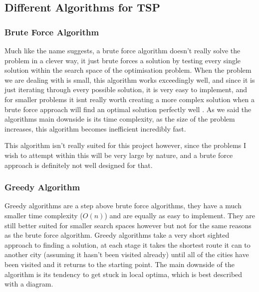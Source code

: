 \documentclass[11pt,a4paper,titlepage]{article}
\begin{document}
\subsection{Different Algorithms for TSP}

\subsubsection{Brute Force Algorithm}

Much like the name suggests, a brute force algorithm doesn't really solve the problem in a clever way, it just brute forces a solution by testing every single solution within the search space of the optimisation problem. When the problem we are dealing with is small, this algorithm works exceedingly well, and since it is just iterating through every possible solution, it is very easy to implement, and for smaller problems it isnt really worth creating a more complex solution when a brute force approach will find an optimal solution perfectly well \cite{DiffAlgs}. As we said the algorithms main downside is its time complexity, as the size of the problem increases, this algorithm becomes inefficient incredibly fast.

This algorithm isn't really suited for this project however, since the problems I wish to attempt within this will be very large by nature, and a brute force approach is definitely not well designed for that.

\subsubsection{Greedy Algorithm}

Greedy algorithms are a step above brute force algorithms, they have a much smaller time complexity ($O(n)$) and are equally as easy to implement. They are still better suited for smaller search spaces however but not for the same reasons as the brute force algorithm. Greedy algorithms take a very short sighted approach to finding a solution, at each stage it takes the shortest route it can to another city (assuming it hasn't been visited already) until all of the cities have been visited and it returns to the starting point. The main downside of the algorithm is its tendency to get stuck in local optima, which is best described with a diagram.
\end{document}
